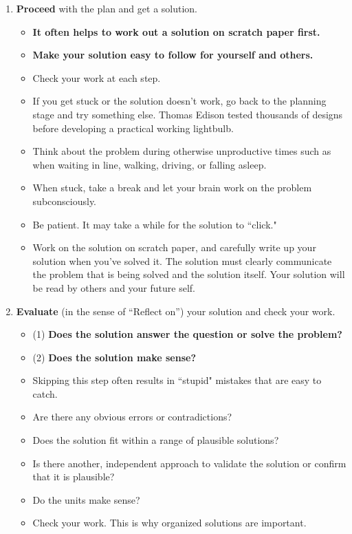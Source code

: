 \begin{enumerate}
\begin{itemize}
\begin{itemize}
    \end{itemize}
\end{itemize}
\item {\bf Proceed} with the plan and get a solution.
\begin{itemize}
    \item {\bf It often helps to work out a solution on scratch paper first.}
    \item {\bf Make your solution easy to follow for yourself and others.}
    \item Check your work at each step.
    \item If you get stuck or the solution doesn't work, go back to the planning stage and try something else. Thomas Edison tested thousands of designs before developing a practical working lightbulb.
    \item Think about the problem during otherwise unproductive times such as when waiting in line, walking, driving, or falling asleep.
    \item When stuck, take a break and let your brain work on the problem subconsciously.
    \item Be patient. It may take a while for the solution to ``click."
    \item Work on the solution on scratch paper, and carefully write up your solution when you've solved it. The solution must clearly communicate the problem that is being solved and the solution itself. Your solution will be read by others and your future self.
\end{itemize}
\item {\bf Evaluate} (in the sense of ``Reflect on'') your solution and check your work.
\begin{itemize}
    \item (1) {\bf Does the solution answer the question or solve the problem?}
    \item (2) {\bf Does the solution make sense?}
    \item Skipping this step often results in ``stupid" mistakes that are easy to catch.
    \item Are there any obvious errors or contradictions?
    \item Does the solution fit within a range of plausible solutions?
    \item Is there another, independent approach to validate the solution or confirm that it is plausible?
    \item Do the units make sense?
    \item Check your work. This is why organized solutions are important.

\end{itemize}
\end{enumerate}
